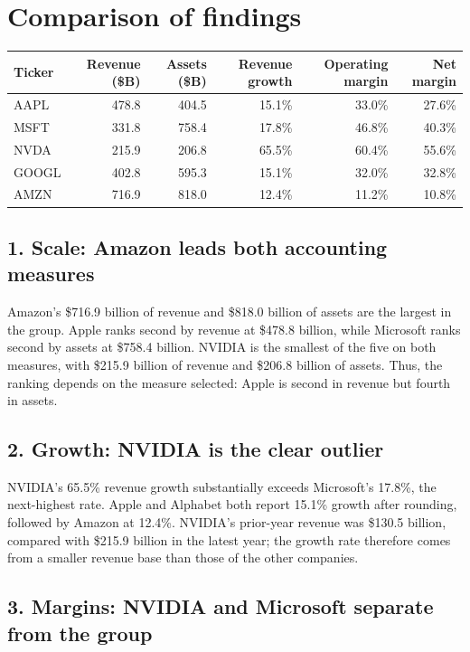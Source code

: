 \documentclass[11pt]{article}
\begin{document}
\section*{Comparison of findings}

\begin{center}
\begin{tabular}{@{}lrrrrr@{}}
\toprule
Ticker & Revenue (\$B) & Assets (\$B) & Revenue growth & Operating margin & Net margin \\
\midrule
AAPL & 478.8 & 404.5 & 15.1\% & 33.0\% & 27.6\% \\
MSFT & 331.8 & 758.4 & 17.8\% & 46.8\% & 40.3\% \\
NVDA & 215.9 & 206.8 & 65.5\% & 60.4\% & 55.6\% \\
GOOGL & 402.8 & 595.3 & 15.1\% & 32.0\% & 32.8\% \\
AMZN & 716.9 & 818.0 & 12.4\% & 11.2\% & 10.8\% \\
\bottomrule
\end{tabular}
\end{center}

\subsection*{1. Scale: Amazon leads both accounting measures}

Amazon's \$716.9 billion of revenue and \$818.0 billion of assets are the largest in the group. Apple ranks second by revenue at \$478.8 billion, while Microsoft ranks second by assets at \$758.4 billion. NVIDIA is the smallest of the five on both measures, with \$215.9 billion of revenue and \$206.8 billion of assets. Thus, the ranking depends on the measure selected: Apple is second in revenue but fourth in assets.

\subsection*{2. Growth: NVIDIA is the clear outlier}

NVIDIA's 65.5\% revenue growth substantially exceeds Microsoft's 17.8\%, the next-highest rate. Apple and Alphabet both report 15.1\% growth after rounding, followed by Amazon at 12.4\%. NVIDIA's prior-year revenue was \$130.5 billion, compared with \$215.9 billion in the latest year; the growth rate therefore comes from a smaller revenue base than those of the other companies.

\subsection*{3. Margins: NVIDIA and Microsoft separate from the group}
\end{document}
